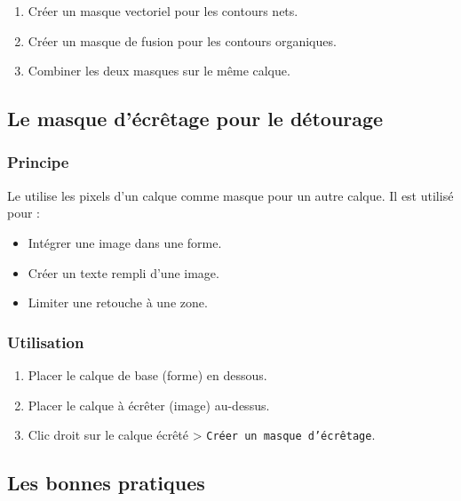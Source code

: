 \begin{enumerate}
    \item Créer un masque vectoriel pour les contours nets.
    \item Créer un masque de fusion pour les contours organiques.
    \item Combiner les deux masques sur le même calque.
\end{enumerate}

\subsection{Le masque d'écrêtage pour le détourage}

\subsubsection{Principe}

Le  utilise les pixels d'un calque comme masque pour un autre calque. Il est utilisé pour :

\begin{itemize}
    \item Intégrer une image dans une forme.
    \item Créer un texte rempli d'une image.
    \item Limiter une retouche à une zone.
\end{itemize}

\subsubsection{Utilisation}

\begin{enumerate}
    \item Placer le calque de base (forme) en dessous.
    \item Placer le calque à écrêter (image) au-dessus.
    \item Clic droit sur le calque écrêté > \texttt{Créer un masque d'écrêtage}.
\end{enumerate}

\subsection{Les bonnes pratiques}

